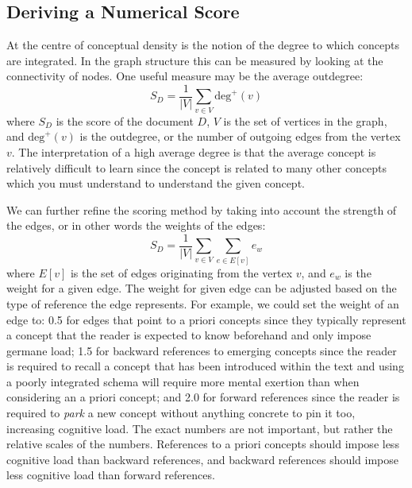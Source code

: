 \documentclass[12pt]{article}
\theoremstyle{grammarstyle}
\begin{document}
\subsection{Deriving a Numerical Score} \label{sec:quantifying_conceptual_density}
At the centre of conceptual density is the notion of the degree to which concepts are integrated. In the graph structure this can be measured by looking at the connectivity of nodes. One useful measure may be the average outdegree:
\begin{equation} \label{eq:simple score}
    S_D = \frac{1}{|V|} \sum_{v \in V} \text{deg}^+(v)
\end{equation}
where $S_D$ is the score of the document $D$, $V$ is the set of vertices in the graph,  and $\text{deg}^+(v)$ is the outdegree, or the number of outgoing edges from the vertex $v$. The interpretation of a high average degree is that the average concept is relatively difficult to learn since the concept is related to many other concepts which you must understand to understand the given concept. 

We can further refine the scoring method by taking into account the strength of the edges, or in other words the weights of the edges:
\begin{equation} \label{eq:weighed score}
    S_D = \frac{1}{|V|} \sum_{v \in V} \sum_{e \in E[v]} e_w
\end{equation}
where $E[v]$ is the set of edges originating from the vertex $v$, and $e_w$ is the weight for a given edge. 
The weight for given edge can be adjusted based on the type of reference the edge represents. For example, we could set the weight of an edge to: 0.5 for edges that point to a priori concepts since they typically represent a concept that the reader is expected to know beforehand and only impose germane load; 1.5 for backward references to emerging concepts since the reader is required to recall a concept that has been introduced within the text and using a poorly integrated schema will require more mental exertion than when considering an a priori concept; and 2.0 for forward references since the reader is required to \textit{park} a new concept without anything concrete to pin it too, increasing cognitive load. The exact numbers are not important, but rather the relative scales of the numbers. References to a priori concepts should impose less cognitive load than backward references, and backward references should impose less cognitive load than forward references.
\end{document}
